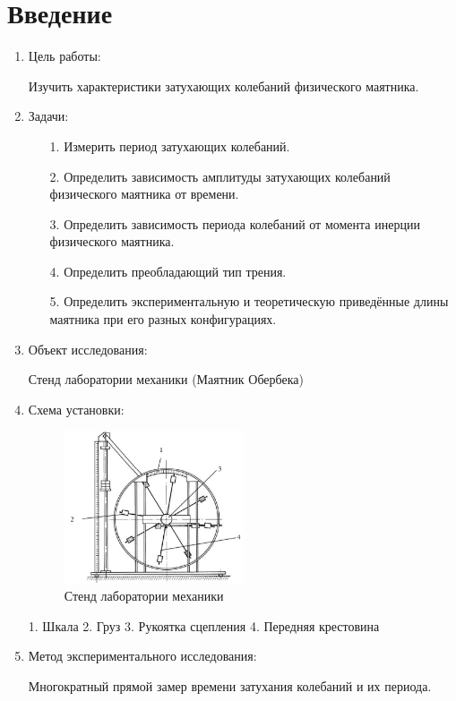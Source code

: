 \documentclass[12pt, a4paper]{article}
\begin{document}
\section{Введение}
\begin{enumerate}
\item Цель работы:

Изучить характеристики затухающих колебаний физического маятника.

\item Задачи:
	\begin{enumerate}
		\item[1.]  Измерить период затухающих колебаний.
		\item[2.] Определить зависимость амплитуды затухающих колебаний физического маятника от времени.
		\item[3.] Определить зависимость периода колебаний от момента инерции физического маятника.
		\item[4.] Определить преобладающий тип трения.
		\item[5.] Определить экспериментальную и теоретическую приведённые длины маятника при его разных конфигурациях.
	\end{enumerate}
		
\item Объект исследования:

Стенд лаборатории механики (Маятник Обербека)

\item Схема установки:
\begin{figure}[H]
\includegraphics[width=0.5\textwidth]{pendulum.png}
\centering
\caption{Стенд лаборатории механики}
\end{figure}

1. Шкала
2. Груз
3. Рукоятка сцепления
4. Передняя крестовина

\item Метод экспериментального исследования:

Многократный прямой замер времени затухания колебаний и  их периода.


\end{enumerate}
\end{document}
